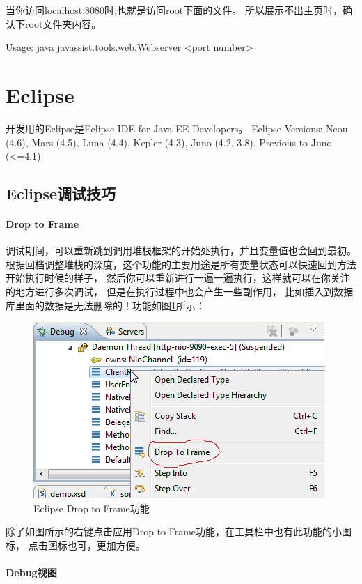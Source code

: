 \documentclass{book}
\begin{document}
当你访问localhost:8080时,也就是访问root下面的文件。
所以展示不出主页时，确认下root文件夹内容。

Usage: java javassist.tools.web.Webserver <port number>

\section{Eclipse}

开发用的Eclipse是Eclipse IDE for Java EE Developers。
Eclipse Versions: 
Neon (4.6), Mars (4.5), 
Luna (4.4), Kepler (4.3), Juno (4.2, 3.8), Previous to Juno (<=4.1)

\subsection{Eclipse调试技巧}

\paragraph{Drop to Frame}

调试期间，可以重新跳到调用堆栈框架的开始处执行，并且变量值也会回到最初。
根据回档调整堆栈的深度，这个功能的主要用途是所有变量状态可以快速回到方法开始执行时候的样子，
然后你可以重新进行一遍一遍执行，这样就可以在你关注的地方进行多次调试，
但是在执行过程中也会产生一些副作用，
比如插入到数据库里面的数据是无法删除的！功能如图\ref{code:EclipseDropToFrame}所示：

\begin{figure}[htbp]
	\centering
	\includegraphics[scale=0.6]{EclipseDropToFrame.png}
	\caption{Eclipse Drop to Frame功能}
	\label{code:EclipseDropToFrame}
\end{figure}

除了如图所示的右键点击应用Drop to Frame功能，在工具栏中也有此功能的小图标，
点击图标也可，更加方便。

\paragraph{Debug视图}
\end{document}
